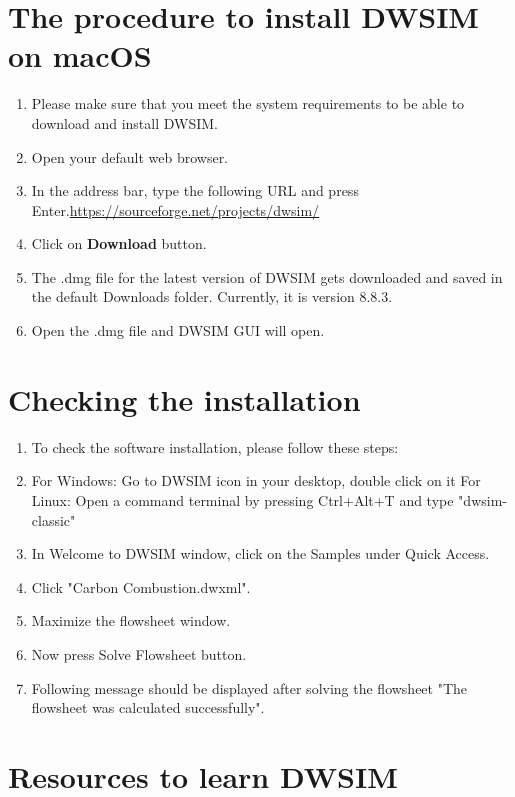 \documentclass[a4paper,12pt]{article}
\begin{document}
\section{The procedure to install DWSIM on macOS}

\begin{enumerate}
	\item Please make sure that you meet the system requirements to be able to download and install DWSIM.
	\item Open your default web browser.
	\item In the address bar, type the following URL and press Enter.\newline \url{https://sourceforge.net/projects/dwsim/}
	\item Click on \textbf{Download} button.
	\item The .dmg file for the latest version of DWSIM gets downloaded and saved in the default Downloads folder. Currently, it is version 8.8.3.
	\item Open the .dmg file and DWSIM GUI will open.
\end{enumerate}


\section{Checking the installation}

\begin{enumerate}

\item To check the software installation, please follow these steps:
\item For Windows: Go to DWSIM icon in your desktop, double click on it
\newline For Linux: Open a command terminal by pressing Ctrl+Alt+T and type "dwsim-classic"
\item In Welcome to DWSIM window, click on the Samples under Quick Access.
\item Click "Carbon Combustion.dwxml".
\item Maximize the flowsheet window.
\item Now press Solve Flowsheet button.
\item Following message should be displayed after solving the flowsheet "The flowsheet was calculated successfully".

\end{enumerate}
\section{Resources to learn DWSIM}
\end{document}
